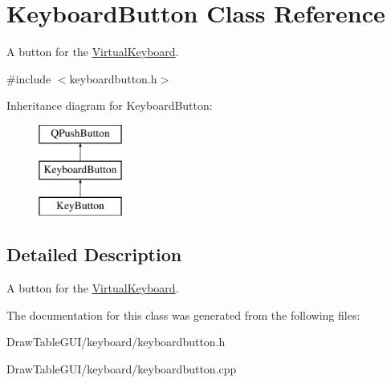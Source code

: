 \hypertarget{classKeyboardButton}{}\section{Keyboard\+Button Class Reference}
\label{classKeyboardButton}


A button for the \hyperlink{classVirtualKeyboard}{Virtual\+Keyboard}.  




{\ttfamily \#include $<$keyboardbutton.\+h$>$}

Inheritance diagram for Keyboard\+Button\+:\begin{figure}[H]
\begin{center}
\leavevmode
\includegraphics[height=3.000000cm]{classKeyboardButton}
\end{center}
\end{figure}


\subsection{Detailed Description}
A button for the \hyperlink{classVirtualKeyboard}{Virtual\+Keyboard}. 

The documentation for this class was generated from the following files\+:\begin{DoxyCompactItemize}
\item 
Draw\+Table\+G\+U\+I/keyboard/keyboardbutton.\+h\item 
Draw\+Table\+G\+U\+I/keyboard/keyboardbutton.\+cpp\end{DoxyCompactItemize}
